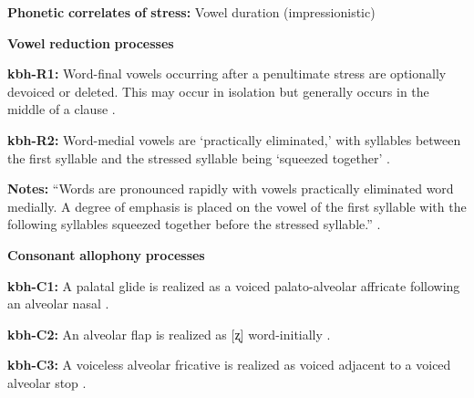 \documentclass[output=paper]{langsci/langscibook}
\begin{document}
\begin{styleBody}
\textbf{Phonetic} \textbf{correlates} \textbf{of} \textbf{stress:} Vowel duration (impressionistic)
\end{styleBody}

\begin{styleBody}
\textbf{Vowel} \textbf{reduction} \textbf{processes}
\end{styleBody}

\begin{styleBody}
\textbf{kbh-R1:} Word-final vowels occurring after a penultimate stress are optionally devoiced or deleted. This may occur in isolation but generally occurs in the middle of a clause \citep[86]{Howard1967}.
\end{styleBody}

\begin{styleBody}
\textbf{kbh-R2:} Word-medial vowels are ‘practically eliminated,’ with syllables between the first syllable and the stressed syllable being ‘squeezed together’ \citep[86-7]{Howard1967}.
\end{styleBody}

\begin{styleBody}
\textbf{Notes:} “Words are pronounced rapidly with vowels practically eliminated word medially. A degree of emphasis is placed on the vowel of the first syllable with the following syllables squeezed together before the stressed syllable.” \citep[86-7]{Howard1967}.
\end{styleBody}

\begin{styleBody}
\textbf{Consonant} \textbf{allophony} \textbf{processes}
\end{styleBody}

\begin{styleBody}
\textbf{kbh-C1:} A palatal glide is realized as a voiced palato-alveolar affricate following an alveolar nasal \citep{Howard1967}.
\end{styleBody}

\begin{styleBody}
\textbf{kbh-C2:} An alveolar flap is realized as [ʐ] word-initially \citep[78]{Howard1967}.
\end{styleBody}

\begin{styleBody}
\textbf{kbh-C3:} A voiceless alveolar fricative is realized as voiced adjacent to a voiced alveolar stop \citep[78]{Howard1967}.
\end{styleBody}
\end{document}

